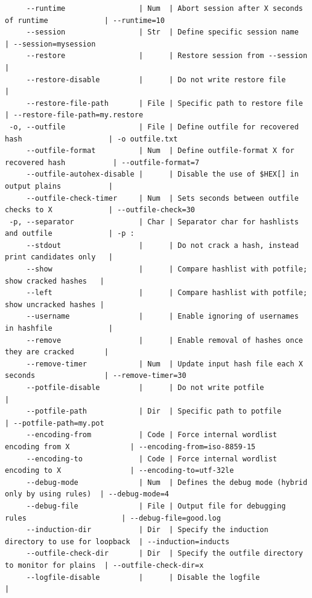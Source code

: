 \documentclass{article}
\begin{document}
\begin{lstlisting}
     --runtime                 | Num  | Abort session after X seconds of runtime             | --runtime=10
     --session                 | Str  | Define specific session name                         | --session=mysession
     --restore                 |      | Restore session from --session                       |
     --restore-disable         |      | Do not write restore file                            |
     --restore-file-path       | File | Specific path to restore file                        | --restore-file-path=my.restore
 -o, --outfile                 | File | Define outfile for recovered hash                    | -o outfile.txt
     --outfile-format          | Num  | Define outfile-format X for recovered hash           | --outfile-format=7
     --outfile-autohex-disable |      | Disable the use of $HEX[] in output plains           |
     --outfile-check-timer     | Num  | Sets seconds between outfile checks to X             | --outfile-check=30
 -p, --separator               | Char | Separator char for hashlists and outfile             | -p :
     --stdout                  |      | Do not crack a hash, instead print candidates only   |
     --show                    |      | Compare hashlist with potfile; show cracked hashes   |
     --left                    |      | Compare hashlist with potfile; show uncracked hashes |
     --username                |      | Enable ignoring of usernames in hashfile             |
     --remove                  |      | Enable removal of hashes once they are cracked       |
     --remove-timer            | Num  | Update input hash file each X seconds                | --remove-timer=30
     --potfile-disable         |      | Do not write potfile                                 |
     --potfile-path            | Dir  | Specific path to potfile                             | --potfile-path=my.pot
     --encoding-from           | Code | Force internal wordlist encoding from X              | --encoding-from=iso-8859-15
     --encoding-to             | Code | Force internal wordlist encoding to X                | --encoding-to=utf-32le
     --debug-mode              | Num  | Defines the debug mode (hybrid only by using rules)  | --debug-mode=4
     --debug-file              | File | Output file for debugging rules                      | --debug-file=good.log
     --induction-dir           | Dir  | Specify the induction directory to use for loopback  | --induction=inducts
     --outfile-check-dir       | Dir  | Specify the outfile directory to monitor for plains  | --outfile-check-dir=x
     --logfile-disable         |      | Disable the logfile                                  |

\end{lstlisting}
\end{document}
